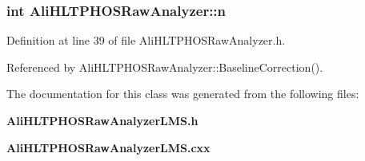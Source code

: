 \subsubsection{\setlength{\rightskip}{0pt plus 5cm}int {\bf Ali\-HLTPHOSRaw\-Analyzer::n}\hspace{0.3cm}{\tt  [protected, inherited]}}\label{classAliHLTPHOSRawAnalyzer_AliHLTPHOSRawAnalyzerPeakFinderp7}




Definition at line 39 of file Ali\-HLTPHOSRaw\-Analyzer.h.

Referenced by Ali\-HLTPHOSRaw\-Analyzer::Baseline\-Correction().

The documentation for this class was generated from the following files:\begin{CompactItemize}
\item 
{\bf Ali\-HLTPHOSRaw\-Analyzer\-LMS.h}\item 
{\bf Ali\-HLTPHOSRaw\-Analyzer\-LMS.cxx}\end{CompactItemize}
